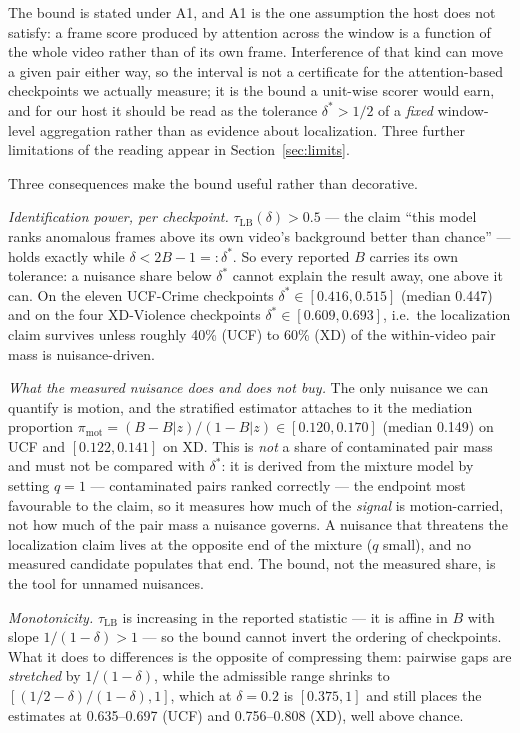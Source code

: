 \documentclass[number,preprint,12pt]{elsarticle}
\begin{document}
The bound is stated under A1, and A1 is the one assumption the host does not
satisfy: a frame score produced by attention across the window is a function of
the whole video rather than of its own frame. Interference of that kind can move
a given pair either way, so the interval is not a certificate for the
attention-based checkpoints we actually measure; it is the bound a unit-wise
scorer would earn, and for our host it should be read as the tolerance
\(\delta^{*}>1/2\) of a \emph{fixed} window-level aggregation rather than as evidence
about localization. Three further limitations of the reading appear in
Section~\ref{sec:limits}.

Three consequences make the bound useful rather than decorative.

\emph{Identification power, per checkpoint.} \(\tau_{\mathrm{LB}}(\delta)>0.5\) --- the claim ``this model
ranks anomalous frames above its own video's background better than chance'' ---
holds exactly while \(\delta<2B-1=:\delta^{*}\). So every reported \(B\) carries its own
tolerance: a nuisance share below \(\delta^{*}\) cannot explain the result away, one above
it can. On the eleven UCF-Crime checkpoints \(\delta^{*}\in[0.416,0.515]\) (median 0.447) and
on the four XD-Violence checkpoints \(\delta^{*}\in[0.609,0.693]\), i.e.~the localization
claim survives unless roughly 40\% (UCF) to 60\% (XD) of the within-video pair mass
is nuisance-driven.

\emph{What the measured nuisance does and does not buy.} The only nuisance we can
quantify is motion, and the stratified estimator attaches to it the mediation
proportion \(\pi_{\mathrm{mot}}=(B-B|z)/(1-B|z)\in[0.120,0.170]\) (median 0.149) on UCF and
\([0.122,0.141]\) on XD. This is \emph{not} a share of contaminated pair mass and must
not be compared with \(\delta^{*}\): it is derived from the mixture model by
setting \(q=1\) --- contaminated pairs ranked correctly --- the endpoint most
favourable to the claim, so it measures how much of the \emph{signal} is
motion-carried, not how much of the pair mass a nuisance governs. A nuisance
that threatens the localization claim lives at the opposite end of the mixture
(\(q\) small), and no measured candidate populates that end. The bound, not the
measured share, is the tool for unnamed nuisances.

\emph{Monotonicity.} \(\tau_{\mathrm{LB}}\) is increasing in the reported statistic --- it is
affine in \(B\) with slope \(1/(1-\delta)>1\) --- so the bound cannot invert the ordering
of checkpoints. What it does to differences is the opposite of compressing them:
pairwise gaps are \emph{stretched} by \(1/(1-\delta)\), while the admissible range shrinks
to \([(1/2-\delta)/(1-\delta),1]\), which at \(\delta=0.2\) is \([0.375,1]\) and still places the
estimates at 0.635--0.697 (UCF) and 0.756--0.808 (XD), well above chance.
\end{document}

